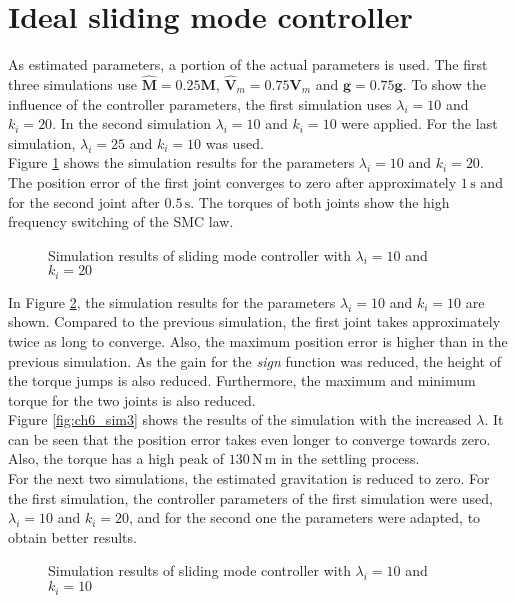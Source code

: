\section{Ideal sliding mode controller}
As estimated parameters, a portion of the actual parameters is used. The first three simulations use $\hat{\mathbf{M}} = 0.25\mathbf{M}$, $\hat{\mathbf{V}}_m = 0.75\mathbf{V}_m$ and $\hat{\mathbf{g}} = 0.75\mathbf{g}$. To show the influence of the controller parameters, the first simulation uses $\lambda_i = 10$ and $k_i = 20$. In the second simulation $\lambda_i = 10$ and $k_i = 10$ were applied. For the last simulation, $\lambda_i = 25$ and $k_i = 10$ was used.\\
Figure \ref{fig:ch6_sim1} shows the simulation results for the parameters $\lambda_i = 10$ and $k_i = 20$. The position error of the first joint converges to zero after approximately $1\,\mathrm{s}$ and for the second joint after $0.5\,\mathrm{s}$. The torques of both joints show the high frequency switching of the \ac{SMC} law.
\begin{figure}[H]
	\centering
	
	\caption{Simulation results of sliding mode controller with $\lambda_i = 10$ and $k_i = 20$}
	\label{fig:ch6_sim1}
\end{figure}
In Figure \ref{fig:ch6_sim2}, the simulation results for the parameters $\lambda_i = 10$ and $k_i = 10$ are shown. Compared to the previous simulation, the first joint takes approximately twice as long to converge. Also, the maximum position error is higher than in the previous simulation. As the gain for the \textit{sign} function was reduced, the height of the torque jumps is also reduced. Furthermore, the maximum and minimum torque for the two joints is also reduced.\\
Figure \ref{fig:ch6_sim3} shows the results of the simulation with the increased $\lambda$. It can be seen that the position error takes even longer to converge towards zero. Also, the torque has a high peak of $130\,\mathrm{N\,m}$ in the settling process.\\
For the next two simulations, the estimated gravitation is reduced to zero. For the first simulation, the controller parameters of the first simulation were used, $\lambda_i = 10$ and $k_i = 20$, and for the second one the parameters were adapted, to obtain better results.
\begin{figure}[H]
	\centering
	
	\caption{Simulation results of sliding mode controller with $\lambda_i = 10$ and $k_i = 10$}
	\label{fig:ch6_sim2}
\end{figure}
